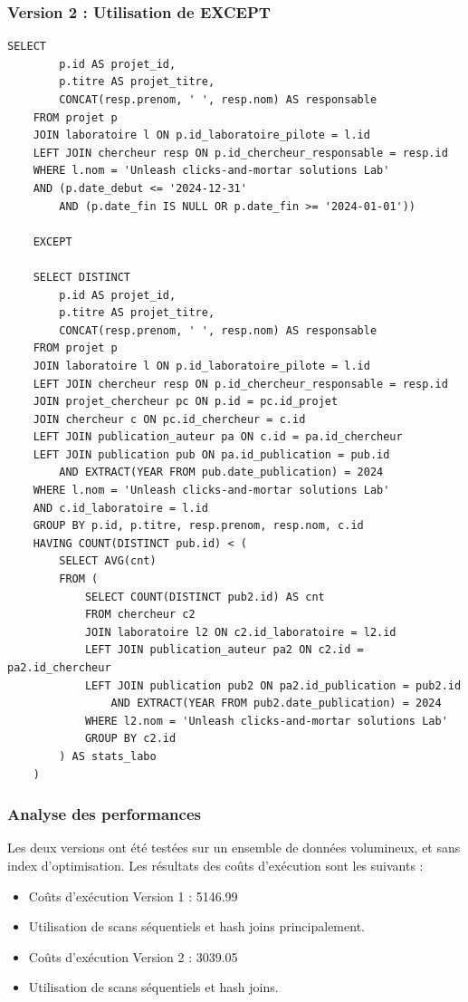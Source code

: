 \documentclass[12pt,a4paper]{article}
\begin{document}
\subsubsection{Version 2 : Utilisation de EXCEPT}
\begin{lstlisting}[style=sqlstyle, caption=R2 - Version 2]
    SELECT 
        p.id AS projet_id,
        p.titre AS projet_titre,
        CONCAT(resp.prenom, ' ', resp.nom) AS responsable
    FROM projet p
    JOIN laboratoire l ON p.id_laboratoire_pilote = l.id
    LEFT JOIN chercheur resp ON p.id_chercheur_responsable = resp.id
    WHERE l.nom = 'Unleash clicks-and-mortar solutions Lab'
    AND (p.date_debut <= '2024-12-31' 
        AND (p.date_fin IS NULL OR p.date_fin >= '2024-01-01'))

    EXCEPT

    SELECT DISTINCT
        p.id AS projet_id,
        p.titre AS projet_titre,
        CONCAT(resp.prenom, ' ', resp.nom) AS responsable
    FROM projet p
    JOIN laboratoire l ON p.id_laboratoire_pilote = l.id
    LEFT JOIN chercheur resp ON p.id_chercheur_responsable = resp.id
    JOIN projet_chercheur pc ON p.id = pc.id_projet
    JOIN chercheur c ON pc.id_chercheur = c.id
    LEFT JOIN publication_auteur pa ON c.id = pa.id_chercheur
    LEFT JOIN publication pub ON pa.id_publication = pub.id 
        AND EXTRACT(YEAR FROM pub.date_publication) = 2024
    WHERE l.nom = 'Unleash clicks-and-mortar solutions Lab'
    AND c.id_laboratoire = l.id
    GROUP BY p.id, p.titre, resp.prenom, resp.nom, c.id
    HAVING COUNT(DISTINCT pub.id) < (
        SELECT AVG(cnt)
        FROM (
            SELECT COUNT(DISTINCT pub2.id) AS cnt
            FROM chercheur c2
            JOIN laboratoire l2 ON c2.id_laboratoire = l2.id
            LEFT JOIN publication_auteur pa2 ON c2.id = pa2.id_chercheur
            LEFT JOIN publication pub2 ON pa2.id_publication = pub2.id 
                AND EXTRACT(YEAR FROM pub2.date_publication) = 2024
            WHERE l2.nom = 'Unleash clicks-and-mortar solutions Lab'
            GROUP BY c2.id
        ) AS stats_labo
    )
\end{lstlisting}

\subsubsection{Analyse des performances}
Les deux versions ont été testées sur un ensemble de données volumineux, et sans index d'optimisation. Les résultats des coûts d'exécution sont les suivants :
\begin{itemize}
    \item Coûts d'exécution Version 1 : 5146.99
    \item Utilisation de scans séquentiels et hash joins principalement.
    \item Coûts d'exécution Version 2 : 3039.05
    \item Utilisation de scans séquentiels et hash joins.
\end{itemize}
\end{document}
